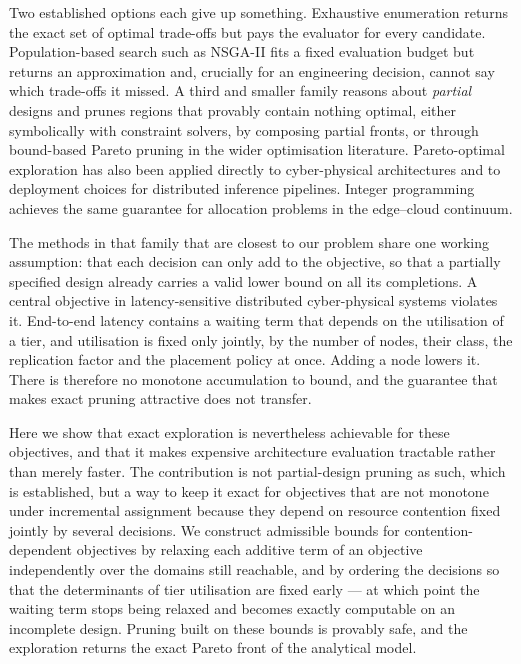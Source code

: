 \documentclass[pdflatex,sn-nature,lineno]{sn-jnl}
\begin{document}
Two established options each give up something. Exhaustive enumeration returns the exact
set of optimal trade-offs but pays the evaluator for every candidate. Population-based
search such as NSGA-II\cite{deb2002nsga2} fits a fixed evaluation budget but returns an
approximation and, crucially for an engineering decision, cannot say which trade-offs it
missed. A third and smaller family reasons about \emph{partial} designs and prunes
regions that provably contain nothing optimal, either symbolically with constraint
solvers\cite{neubauer2018exact,haubelt2018asp,lukasiewycz2008symbolic,
neubauer2020consistent}, by composing partial fronts\cite{haubelt2003pareto}, or through
bound-based Pareto pruning in the wider optimisation
literature\cite{paretopruning2022,stewart1991moa,mandow2010namoa}. Pareto-optimal
exploration has also been applied directly to cyber-physical architectures
\cite{amir2020pareto,xiao2024contrarc} and to deployment choices for distributed
inference pipelines\cite{guo2023}. Integer programming achieves the same
guarantee for allocation problems in the edge--cloud
continuum\cite{kouloumpris2024optimization,kouloumpris2026reliability}.

The methods in that family that are closest to our problem share one working
assumption: that each decision can only add to the objective, so that a partially
specified design already carries a valid lower bound on all its completions. A central objective in latency-sensitive distributed
cyber-physical systems violates it. End-to-end latency contains a waiting term that depends on the
utilisation of a tier, and utilisation is fixed only jointly, by the number of nodes,
their class, the replication factor and the placement policy at once. Adding a node
lowers it. There is therefore no monotone accumulation to bound, and the guarantee that
makes exact pruning attractive does not transfer.

Here we show that exact exploration is nevertheless achievable for these objectives, and
that it makes expensive architecture evaluation tractable rather than merely faster. The
contribution is not partial-design pruning as such, which is established, but a way to
keep it exact for objectives that are not monotone under incremental assignment because
they depend on resource contention fixed jointly by several decisions. We
construct admissible bounds for contention-dependent objectives by relaxing each additive
term of an objective independently over the domains still reachable, and by ordering the
decisions so that the determinants of tier utilisation are fixed early --- at which point
the waiting term stops being relaxed and becomes exactly computable on an incomplete
design. Pruning built on these bounds is provably safe, and the exploration returns the
exact Pareto front of the analytical model.
\end{document}
